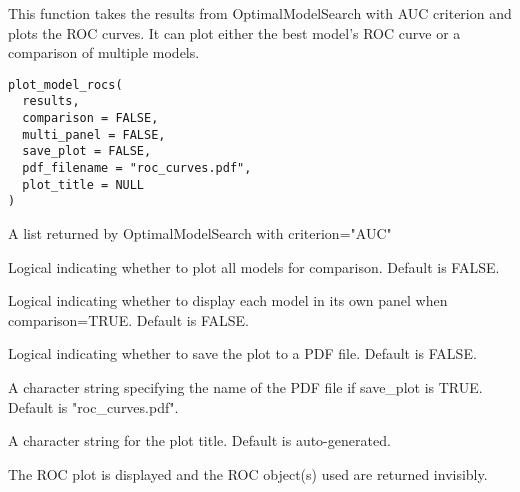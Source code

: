 \documentclass[a4paper]{book}
\begin{document}
%
\begin{Description}
This function takes the results from OptimalModelSearch with AUC criterion
and plots the ROC curves. It can plot either the best model's ROC curve or
a comparison of multiple models.
\end{Description}
%
\begin{Usage}
\begin{verbatim}
plot_model_rocs(
  results,
  comparison = FALSE,
  multi_panel = FALSE,
  save_plot = FALSE,
  pdf_filename = "roc_curves.pdf",
  plot_title = NULL
)
\end{verbatim}
\end{Usage}
%
\begin{Arguments}
\begin{ldescription}
\item[\code{results}] A list returned by OptimalModelSearch with criterion="AUC"

\item[\code{comparison}] Logical indicating whether to plot all models for comparison. Default is FALSE.

\item[\code{multi\_panel}] Logical indicating whether to display each model in its own panel when comparison=TRUE. Default is FALSE.

\item[\code{save\_plot}] Logical indicating whether to save the plot to a PDF file. Default is FALSE.

\item[\code{pdf\_filename}] A character string specifying the name of the PDF file if
save\_plot is TRUE. Default is "roc\_curves.pdf".

\item[\code{plot\_title}] A character string for the plot title. Default is auto-generated.
\end{ldescription}
\end{Arguments}
%
\begin{Value}
The ROC plot is displayed and the ROC object(s) used are returned invisibly.
\end{Value}
%
\end{document}
